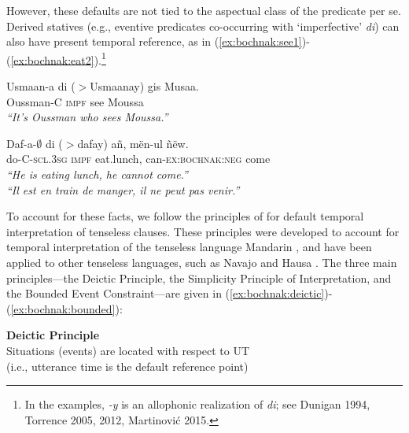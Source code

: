 \documentclass[output=paper,newtxmath,modfonts,nonflat,draftmode]{langsci/langscibook}
\begin{document}
However, these defaults are not tied to the aspectual class of the predicate
per se. Derived statives (e.g., eventive predicates co-occurring with
`imperfective'  \textit{di}) can also have present temporal reference,
as in (\ref{ex:bochnak:see1})-(\ref{ex:bochnak:eat2}).\footnote{In the examples, \textit{-y} is
an allophonic realization of \textit{di}; see Dunigan 1994, Torrence
2005, 2012, Martinovi\'c 2015.}



\ea
\gll Usmaan-a {di ($>$Usmaanay)} gis Musaa. \\
Oussman-C \textsc{impf} see Moussa \\
\glt \textit{``It's Oussman who sees Moussa.''}\label{ex:bochnak:see1}
\z

\ea
\gll Daf-a-$\emptyset$ {di ($>$dafay)} a\~n, m\"en-ul \~n\"ew.\\
do-C-\textsc{scl.3sg} \textsc{impf} eat.lunch, can-\textsc{ex:bochnak:neg} come\\
\glt \textit{``He is eating lunch, he cannot come.''}\\
\textit{``Il est en train de manger, il ne peut pas venir.''}\hfill\citep[p.~263]{robert91approche}\label{ex:bochnak:eat2}
\z




To account for these facts, we follow the principles of \citet{smith05temporal, smith07time} for default temporal interpretation of tenseless clauses. These principles were developed to account for temporal interpretation of the tenseless language Mandarin \citep{smith05temporal}, and have been applied to other tenseless languages, such as Navajo \citep{smith07time} and Hausa \citep{mucha13temporal}. The three main principles---the Deictic Principle, the Simplicity Principle of Interpretation, and the Bounded Event Constraint---are given in (\ref{ex:bochnak:deictic})-(\ref{ex:bochnak:bounded}):

\ea\label{ex:bochnak:deictic} \textbf{Deictic Principle} \\ Situations (events) are located with respect to UT \\(i.e., utterance time is the default reference point)
\z
\end{document}
